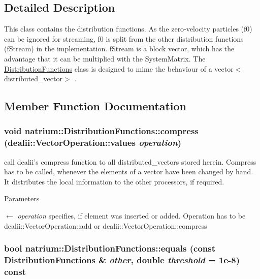 \subsection{Detailed Description}
This class contains the distribution functions. As the zero-\/velocity particles (f0) can be ignored for streaming, f0 is split from the other distribution functions (fStream) in the implementation. fStream is a block vector, which has the advantage that it can be multiplied with the SystemMatrix. The \hyperlink{classnatrium_1_1DistributionFunctions}{DistributionFunctions} class is designed to mime the behaviour of a vector$<$distributed\_\-vector$>$ . 

\subsection{Member Function Documentation}
\hypertarget{classnatrium_1_1DistributionFunctions_a5b0afbafe841922dd3f949cc315b5533}{
\subsubsection[{compress}]{\setlength{\rightskip}{0pt plus 5cm}void natrium::DistributionFunctions::compress (dealii::VectorOperation::values {\em operation})}}
\label{classnatrium_1_1DistributionFunctions_a5b0afbafe841922dd3f949cc315b5533}


call dealii's compress function to all distributed\_\-vectors stored herein. Compress has to be called, whenever the elements of a vector have been changed by hand. It distributes the local information to the other processors, if required. 
\begin{DoxyParams}{Parameters}
\item[\mbox{$\leftarrow$} {\em operation}]specifies, if element was inserted or added. Operation has to be dealii::VectorOperation::add or dealii::VectorOperation::compress \end{DoxyParams}
\hypertarget{classnatrium_1_1DistributionFunctions_af7132264087f7000ffe8b191210b4552}{
\subsubsection[{equals}]{\setlength{\rightskip}{0pt plus 5cm}bool natrium::DistributionFunctions::equals (const {\bf DistributionFunctions} \& {\em other}, \/  double {\em threshold} = {\ttfamily 1e-\/8}) const}}
\label{classnatrium_1_1DistributionFunctions_af7132264087f7000ffe8b191210b4552}


